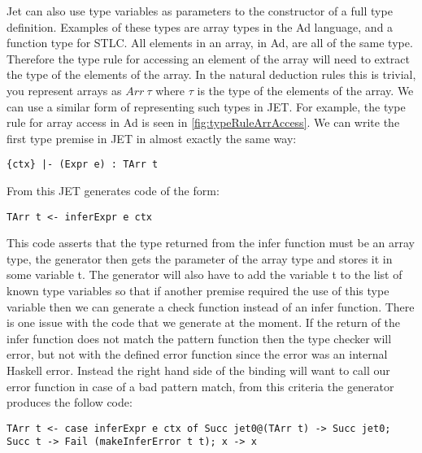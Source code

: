Jet can also use type variables as parameters to the constructor of a full type definition.
Examples of these types are array types in the Ad language, and a function type for STLC.
All elements in an array, in Ad, are all of the same type.
Therefore the type rule for accessing an element of the array will need to extract the type of the elements of the array.
In the natural deduction rules this is trivial, you represent arrays as $Arr~\tau$ where $\tau$ is the type of the elements of the array.
We can use a similar form of representing such types in JET.
For example, the type rule for array access in Ad is seen in \autoref{fig:typeRuleArrAccess}.
We can write the first type premise in JET in almost exactly the same way:
\begin{lstlisting}[numbers=none]
{ctx} |- (Expr e) : TArr t 
\end{lstlisting}
From this JET generates code of the form:
\begin{lstlisting}[numbers=none]
TArr t <- inferExpr e ctx
\end{lstlisting}
This code asserts that the type returned from the infer function must be an array type, the generator then gets the parameter of the array type and stores it in some variable t.
The generator will also have to add the variable t to the list of known type variables so that if another premise required the use of this type variable then we can generate a check function instead of an infer function.
There is one issue with the code that we generate at the moment.
If the return of the infer function does not match the pattern function then the type checker will error, but not with the defined error function since the error was an internal Haskell error.
Instead the right hand side of the binding will want to call our error function in case of a bad pattern match, from this criteria the generator produces the follow code:
\begin{lstlisting}[numbers=none]
TArr t <- case inferExpr e ctx of Succ jet0@(TArr t) -> Succ jet0; Succ t -> Fail (makeInferError t t); x -> x
\end{lstlisting}

